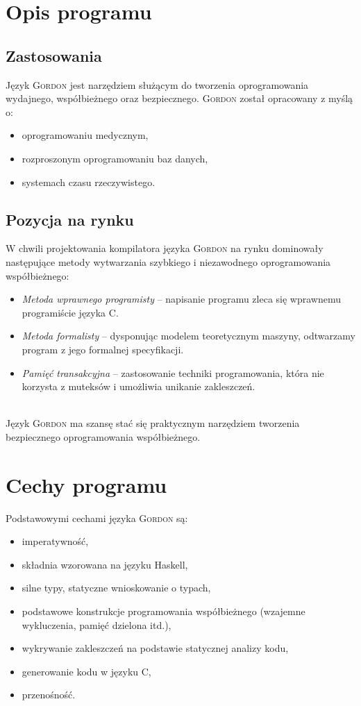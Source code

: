 \documentclass{documentation}
\begin{document}
\section{Opis programu}
\subsection{Zastosowania}
\noindent Język \textsc{Gordon} jest narzędziem służącym do tworzenia oprogramowania wydajnego, współbieżnego oraz bezpiecznego. 
\textsc{Gordon} został opracowany z myślą o:
\begin{itemize}
    \item oprogramowaniu medycznym,
    \item rozproszonym oprogramowaniu baz danych,
    \item systemach czasu rzeczywistego.
\end{itemize}

\subsection{Pozycja na rynku}
\noindent W chwili projektowania kompilatora języka \textsc{Gordon} na rynku dominowały następujące metody wytwarzania szybkiego i niezawodnego oprogramowania współbieżnego:
\begin{itemize}
    \item \emph{Metoda wprawnego programisty} -- napisanie programu zleca się wprawnemu programiście języka \textsc{C}.
    \item \emph{Metoda formalisty} -- dysponując modelem teoretycznym maszyny, odtwarzamy program z jego formalnej specyfikacji.
    \item \emph{Pamięć transakcyjna} -- zastosowanie techniki programowania, która nie korzysta z muteksów i umożliwia unikanie zakleszczeń.
\end{itemize}
~\\
Język \textsc{Gordon} ma szansę stać się praktycznym narzędziem tworzenia bezpiecznego oprogramowania współbieżnego.

\section{Cechy programu}
\noindent Podstawowymi cechami języka \textsc{Gordon} są:
\begin{itemize}
\item imperatywność,
\item składnia wzorowana na języku Haskell,
\item silne typy, statyczne wnioskowanie o typach,
\item podstawowe konstrukcje programowania współbieżnego (wzajemne wykluczenia, pamięć dzielona itd.),
\item wykrywanie zakleszczeń na podstawie statycznej analizy kodu,
\item generowanie kodu w języku C,
\item przenośność.
\end{itemize}
\end{document}
